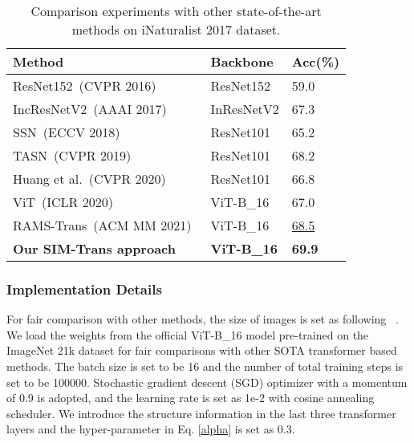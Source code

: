 \documentclass[sigconf, nonacm]{acmart}
\begin{document}
\begin{table}[t]
 \centering
 \caption{Comparison experiments with other state-of-the-art methods on iNaturalist 2017 dataset.}
 \label{table_inat_acc}
 \begin{tabularx}{\linewidth}{|p{4.5cm}|Y|Y|}
  \hline
  
  Method    & Backbone & Acc(\%)  \\ \hline
 
  ResNet152~(CVPR 2016)~\cite{he2016deep}    & ResNet152 &59.0\\
  
  IncResNetV2~(AAAI  2017)~\cite{szegedy2017inception}    & InResNetV2 &67.3\\  
  
  
  
  SSN~(ECCV 2018)~\cite{recasens2018learning}    & ResNet101 &65.2\\
  
  TASN~(CVPR 2019)~\cite{zheng2019looking}    & ResNet101 &68.2\\ 
  
  
  Huang et al.~(CVPR 2020)~\cite{huang2020interpretable}    & ResNet101 &66.8\\


  ViT~(ICLR 2020)~\cite{dosovitskiy2020image}    & ViT-B\_16 &67.0\\ 
  RAMS-Trans~(ACM MM 2021)~\cite{hu2021rams}    & ViT-B\_16 &\underline{68.5}\\
  \textbf{Our SIM-Trans approach}  & \textbf{ViT-B\_16} & \textbf{69.9} \\
  
  \hline
  
 \end{tabularx}
\end{table}




\subsubsection{\textbf{Implementation Details}}

For fair comparison with other methods, the size of images is set as  following ~\cite{hu2021rams}. We load the weights from the official ViT-B\_16 model pre-trained on the ImageNet 21k dataset for fair comparisons with other SOTA transformer based methods. The batch size is set to be 16 and the number of total training steps is set to be 100000. Stochastic gradient descent (SGD) optimizer with a momentum of 0.9 is adopted, and the learning rate is set as 1e-2 with cosine annealing scheduler. We introduce the structure information in the last three transformer layers and the hyper-parameter  in Eq. \ref{alpha} is set as 0.3.
\end{document}
